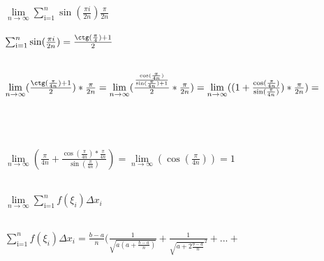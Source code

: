 \documentclass{article}
\begin{document}
$\lim\limits_{n\to \infty} \sum_\text{i=1}^n\sin(\frac{\pi i}{2n} )\frac{\pi}{2n}$\\\\

$\sum_\text{i=1}^n\sin(\frac{\pi i}{2n}) = \frac{\ctg(\frac{\pi}{4}) + 1}{2}$\\\\

\begin{center}
\end{center}

\begin{left}
    $\lim\limits_{n\to \infty}(\frac{\ctg(\frac{\pi}{4n}) + 1}{2}) * \frac{\pi}{2n} = \lim\limits_{n\to \infty}(\frac{\frac{\cos(\frac{\pi}{4n})}{\sin(\frac{\pi}{4n}) + 1}}{2} * \frac{\pi}{2n}) = \lim\limits_{n\to \infty}((1 + \frac{\cos(\frac{\pi}{4n})}{\sin(\frac{\pi}{4n})}) * \frac{\pi}{2n}) = $\\\\\\\
\end{left}

\begin{left}
    $\lim\limits_{n\to \infty}(\frac{\pi}{4n} + \frac{\cos(\frac{\pi}{4n}) * \frac{\pi}{4n}}{\sin(\frac{\pi}{4n})}) = \lim\limits_{n\to \infty}(\cos(\frac{\pi}{4n})) = 1$\\\\
\end{left}

\begin{center}
\end{center}

\begin{center}
\end{center}

\begin{center}
\end{center}

\begin{left}
    $\lim\limits_{n\to \infty}\sum_\text{i=1}^n f(\xi_i)\Delta x_i$\\\\
\end{left}


$\sum_\text{i=1}^n f(\xi_i)\Delta x_i = \frac{b - a}{n}(\frac{1}{\sqrt{a(a + \frac{b - a}{n})}} + \frac{1}{{\sqrt{a + 2\frac{b - a}{n}}}^{2}} + ... +$\\\\
\end{document}
